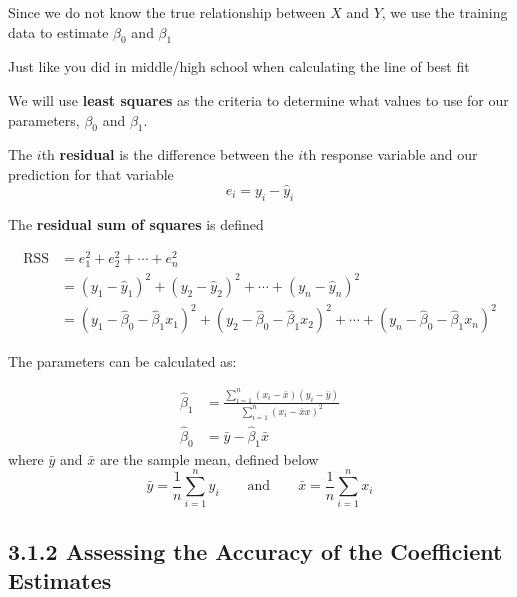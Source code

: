         Since we do not know the true relationship between \(X\) and \(Y\), we use the training data to estimate \(\beta_0\) and \(\beta_1\)

        \begin{note}
            Just like you did in middle/high school when calculating the line of best fit
        \end{note}
        
        We will use \textbf{least squares} as the criteria to determine what values to use for our parameters, \(\beta_0\) and \(\beta_1\).
        
        The \(i\)th \textbf{residual} is the difference between the \(i\)th response variable and our prediction for that variable
        \begin{equation*}
        e_i = y_i - \hat y_i
        \end{equation*}
        
        The \textbf{residual sum of squares} is defined
        
        
        \begin{align*}
            \text{RSS} &= e_1^2 + e_2^2 + \cdots + e_n^2 \\
            &= (y_1 - \hat y_1)^2 +  (y_2 - \hat y_2)^2 + \cdots +  (y_n- \hat y_n)^2 \\
            &= (y_1 - \hat \beta_0 - \hat \beta_1 x_1)^2 + (y_2 - \hat \beta_0 - \hat \beta_1 x_2)^2  + \cdots + (y_n - \hat \beta_0 - \hat \beta_1 x_n)^2 
        \end{align*}
        
        
        The parameters can be calculated as:
        
        \begin{align*}\tag{3.4}
        \hat \beta_1 &= \frac{\sum_{i=1}^n(x_i - \bar x)(y_i-\bar y)}{\sum_{i=1}^n(x_i - \bar xx)^2}\\
        \hat \beta_0 &= \bar y - \hat \beta_1 \bar x
    \end{align*}
     where \(\bar y\) and \(\bar x\) are the sample mean, defined below
     \begin{equation*}
           \bar y = \frac{1}{n}\sum_{i=1}^n y_i \qquad \text{and} \qquad \bar x = \frac{1}{n}\sum_{i=1}^n x_i
     \end{equation*}

        \subsection*{3.1.2 Assessing the Accuracy of the Coefficient Estimates}
